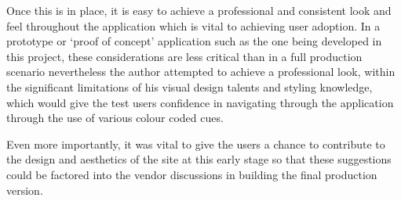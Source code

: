\documentclass[a4paper,12pt]{article}
\begin{document}
Once this is in place,  it is easy to achieve a professional and consistent look and feel throughout the application which is vital to achieving user adoption. In a prototype or `proof of concept' application such as the one being developed in this project, these considerations are less critical than in a full  production scenario nevertheless the author attempted to achieve a professional look, within the significant limitations of his visual design talents and styling knowledge, which would give the test users confidence in navigating through the application through the use of various colour coded cues.

Even more importantly, it was vital to give the users a chance to contribute to the design and aesthetics of the site at this early stage so that these suggestions could be factored into the vendor discussions in building the final production version. 
\end{document}

